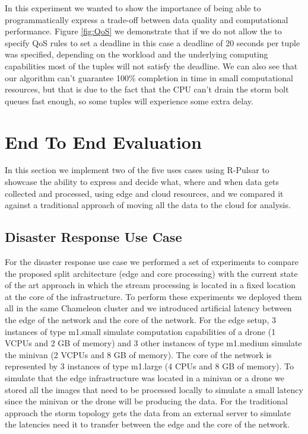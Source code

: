 In this experiment we wanted to show the importance of being able to programmatically express a trade-off between data quality and computational performance. Figure \ref{fig:QoS} we demonstrate that if we do not allow the to specify QoS rules to set a deadline in this case a deadline of 20 seconds per tuple was specified, depending on the workload and the underlying computing capabilities most of the tuples will not satisfy the deadline. We can also see that our algorithm can't guarantee 100\% completion in time in small computational resources, but that is due to the fact that the CPU can't drain the storm bolt queues fast enough, so some tuples will experience some extra delay.

\section{End To End Evaluation}
In this section we implement two of the five uses cases using R-Pulsar to showcase the ability to express and decide what, where and when data gets collected and processed, using edge and cloud resources, and we compared it against a traditional approach of moving all the data to the cloud for analysis.

\subsection{Disaster Response Use Case}

For the disaster response use case we performed a set of experiments to compare the proposed split architecture (edge and core processing) with the current state of the art approach in which the stream processing is located in a fixed location at the core of the infrastructure. To perform these experiments we deployed them all in the same Chameleon cluster and we introduced artificial latency between the edge of the network and the core of the network. For the edge setup, 3 instances of type m1.small simulate computation capabilities of a drone (1 VCPUs and 2 GB of memory) and 3 other instances of type m1.medium simulate the minivan (2 VCPUs and 8 GB of memory). The core of the network is represented by 3 instances of type m1.large (4 CPUs and 8 GB of memory). To simulate that the edge infrastructure was located in a minivan or a drone we stored all the images that need to be processed locally to simulate a small latency since the minivan or the drone will be producing the data. For the traditional approach the storm topology gets the data from an external server to simulate the latencies need it to transfer between the edge and the core of the network.

